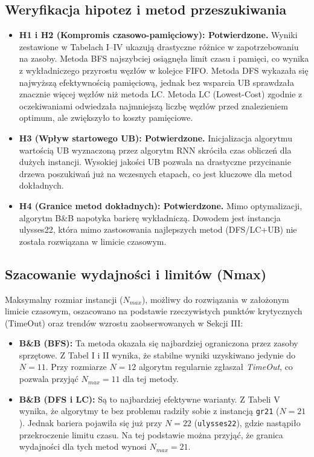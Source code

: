 \documentclass[conference]{IEEEtran}
\begin{document}
        \subsection{Weryfikacja hipotez i metod przeszukiwania}
            \begin{itemize}
                \item \textbf{H1 i H2 (Kompromis czasowo-pamięciowy): Potwierdzone.} Wyniki zestawione w Tabelach I--IV ukazują drastyczne różnice w zapotrzebowaniu na zasoby. Metoda BFS najszybciej osiągnęła limit czasu i pamięci, co wynika z wykładniczego przyrostu węzłów w kolejce FIFO. Metoda DFS wykazała się najwyższą efektywnością pamięciową, jednak bez wsparcia UB sprawdzała znacznie więcej węzłów niż metoda LC. Metoda LC (Lowest-Cost) zgodnie z oczekiwaniami odwiedzała najmniejszą liczbę węzłów przed znalezieniem optimum, ale zwiększyło to koszty pamięciowe.
                \item \textbf{H3 (Wpływ startowego UB): Potwierdzone.} Inicjalizacja algorytmu wartością UB wyznaczoną przez algorytm RNN skróciła czas obliczeń dla dużych instancji. Wysokiej jakości UB pozwala na drastyczne przycinanie drzewa poszukiwań już na wczesnych etapach, co jest kluczowe dla metod dokładnych.
                \item \textbf{H4 (Granice metod dokładnych): Potwierdzone.} Mimo optymalizacji, algorytm B\&B napotyka barierę wykładniczą. Dowodem jest instancja ulysses22, która mimo zastosowania najlepszych metod (DFS/LC+UB) nie została rozwiązana w limicie czasowym.
            \end{itemize}
        \subsection{Szacowanie wydajności i limitów (Nmax)}
            Maksymalny rozmiar instancji ($N_{max}$), możliwy do rozwiązania w założonym limicie czasowym, oszacowano na podstawie rzeczywistych punktów krytycznych (TimeOut) oraz trendów wzrostu zaobserwowanych w Sekcji III:
            \begin{itemize}
                \item \textbf{B\&B (BFS):} Ta metoda okazała się najbardziej ograniczona przez zasoby sprzętowe. Z Tabel I i II wynika, że stabilne wyniki uzyskiwano jedynie do $N=11$. Przy rozmiarze $N=12$ algorytm regularnie zgłaszał \textit{TimeOut}, co pozwala przyjąć \textbf{$N_{max} = 11$} dla tej metody. 
                \item \textbf{B\&B (DFS i LC):} Są to najbardziej efektywne warianty. Z Tabeli V wynika, że algorytmy te bez problemu radziły sobie z instancją \texttt{gr21} ($N=21$). Jednak bariera pojawiła się już przy $N=22$ (\texttt{ulysses22}), gdzie nastąpiło przekroczenie limitu czasu. Na tej podstawie można przyjąć, że granica wydajności dla tych metod wynosi \textbf{$N_{max} = 21$}.
            \end{itemize}
\end{document}

